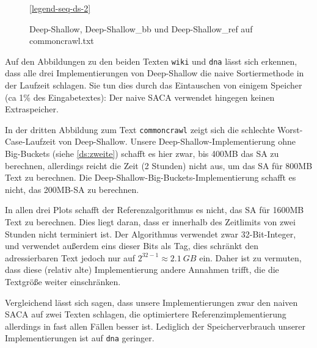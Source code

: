 \begin{figure}[!ht]

    \medskip
    \ref{legend-seq-ds-2}
    \caption{Deep-Shallow, Deep-Shallow\_bb und Deep-Shallow\_ref auf commoncrawl.txt}
    \label{fig-seq-ds-2}
\end{figure}
\FloatBarrier

\noindent
Auf  den Abbildungen zu den beiden Texten \texttt{wiki} und \texttt{dna} lässt sich erkennen,
dass alle drei Implementierungen von Deep-Shallow die naive Sortiermethode in der Laufzeit schlagen.
Sie tun dies durch das Eintauschen von einigem Speicher (ca 1\% des Eingabetextes):
Der naive SACA verwendet hingegen keinen Extraspeicher.

In der dritten Abbildung zum Text \texttt{commoncrawl} zeigt sich die schlechte
Worst-Case-Laufzeit von Deep-Shallow.
Unsere Deep-Shallow-Implementierung ohne Big-Buckets (siehe \cref{ds:zweite}) schafft es hier zwar,
bis 400MB das SA zu berechnen, allerdings reicht die Zeit (2 Stunden) nicht aus, um das SA für 800MB Text zu berechnen.
Die Deep-Shallow-Big-Buckets-Implementierung schafft es nicht, das 200MB-SA zu berechnen.

In allen drei Plots schafft der Referenzalgorithmus es nicht, das SA für 1600MB Text zu berechnen.
Dies liegt daran, dass er innerhalb des Zeitlimits von zwei Stunden nicht terminiert ist.
Der Algorithmus verwendet zwar 32-Bit-Integer, und verwendet außerdem eins dieser Bits als Tag,
dies schränkt den adressierbaren Text jedoch nur auf $2^{32 - 1} \approx \SI{2.1}{GB}$ ein.
Daher ist zu vermuten, dass diese (relativ alte) Implementierung andere Annahmen trifft,
die die Textgröße weiter einschränken.

Vergleichend lässt sich sagen, dass unsere Implementierungen zwar den naiven SACA auf zwei Texten schlagen,
die optimiertere Referenzimplementierung allerdings in fast allen Fällen besser ist.
Lediglich der Speicherverbrauch unserer Implementierungen ist auf \texttt{dna} geringer.

